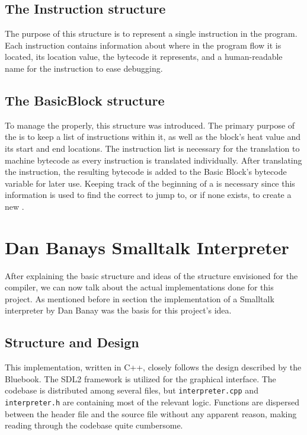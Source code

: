 \subsection{The Instruction structure}
The purpose of this structure is to represent a single instruction in the program. 
Each instruction contains information about where in the program flow it is located, its location value, the bytecode it represents, and a human-readable name for the instruction to ease debugging.

\subsection{The BasicBlock structure}
To manage the \bbs{} properly, this structure was introduced.
The primary purpose of the \bb{} is to keep a list of instructions within it, as well as the block's heat value and its start and end locations. 
The instruction list is necessary for the translation to machine bytecode as every instruction is translated individually. After translating the instruction, the resulting bytecode is added to the Basic Block's bytecode variable for later use. 
Keeping track of the beginning of a \bb{} is necessary since this information is used to find the correct \bb{} to jump to, or if none exists, to create a new \bb{}.

\section{Dan Banays Smalltalk Interpreter}
After explaining the basic structure and ideas of the structure envisioned for the \jit{} compiler, we can now talk about the actual implementations done for this project. As mentioned before in section  the implementation of a Smalltalk interpreter by Dan Banay \cite{dbanayST} was the basis for this project's idea.
\subsection{Structure and Design}
This implementation, written in C++, closely follows the design described by the Bluebook. The SDL2 framework is utilized for the graphical interface.
The codebase is distributed among several files, but \texttt{interpreter.cpp} and \texttt{interpreter.h} are containing most of the relevant logic. Functions are dispersed between the header file and the source file without any apparent reason, making reading through the codebase quite cumbersome. 

